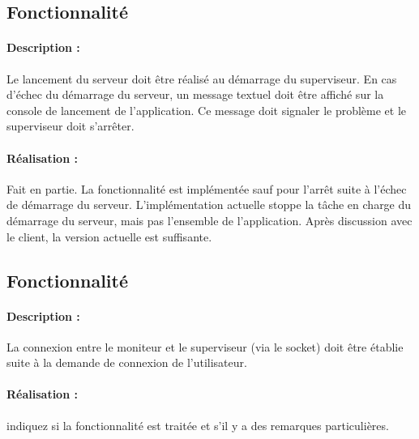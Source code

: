 \documentclass[11pt, a4paper]{paper}
\newcounter{cptreq}
\begin{document}
{\color{gray}
\subsection{Fonctionnalité \thecptreq *}

\paragraph{Description :} Le lancement du serveur doit être réalisé au démarrage du superviseur. En cas d'échec du démarrage du serveur, un message textuel doit être  affiché sur la console de lancement de l'application. Ce message doit signaler le problème et le superviseur doit s'arrêter.

\paragraph{\color{black}Réalisation :}  {\color{blue} Fait en partie. La fonctionnalité est implémentée sauf pour l'arrêt suite à l'échec de démarrage du serveur. L'implémentation actuelle stoppe la tâche en charge du démarrage du serveur, mais pas l'ensemble de l'application. Après discussion avec le client, la version actuelle est suffisante.}
}
{\color{gray}
\subsection{Fonctionnalité \thecptreq *}

\paragraph{Description :} La connexion entre le moniteur et le superviseur (via le socket) doit être établie suite à la demande de connexion de l'utilisateur.

\paragraph{\color{black}Réalisation :}  {\color{red} indiquez si la fonctionnalité est traitée et s'il y a des remarques particulières.}
}
\end{document}
